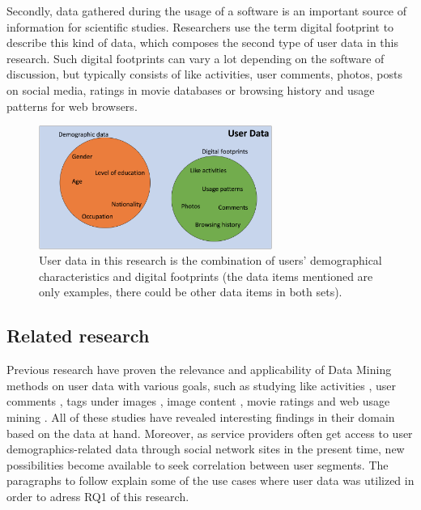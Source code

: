 Secondly, data gathered during the usage of a software is an important source of information for scientific studies. Researchers use the term digital footprint \cite{youyou2015computer} to describe this kind of data, which composes the second type of user data in this research. Such digital footprints can vary a lot depending on the software of discussion, but typically consists of like activities, user comments, photos, posts on social media, ratings in movie databases or browsing history and usage patterns for web browsers. 

\begin{figure}[h] 
  \begin{center}
    \includegraphics[width=3in]{Images/user_data_venn.png}
    \caption{User data in this research is the combination of users' demographical characteristics and digital footprints (the data items mentioned are only examples, there could be other data items in both sets).}
    \label{user_data_venn}
  \end{center}
\end{figure}

\subsection{Related research}
Previous research have proven the relevance and applicability of Data Mining methods on user data with various goals, such as studying like activities \cite{jang2015noreciprocity, jang2016teensengagemorewithfewerphotos, ottoni2013ladies, guy2016whatsyourorganizationlike, jang2015no}, user comments \cite{jang2016teensengagemorewithfewerphotos}, tags under images \cite{jang2016teensengagemorewithfewerphotos}, image content \cite{hu2014we, bakhshi2014faces}, movie ratings \cite{saraee2004data, kabinsingha2012movie} and web usage mining \cite{webusagemining}. All of these studies have revealed interesting findings in their domain based on the data at hand. Moreover, as service providers often get access to user demographics-related data through social network sites in the present time, new possibilities become available to seek correlation between user segments. The paragraphs to follow explain some of the use cases where user data was utilized in order to adress RQ1 of this research.

